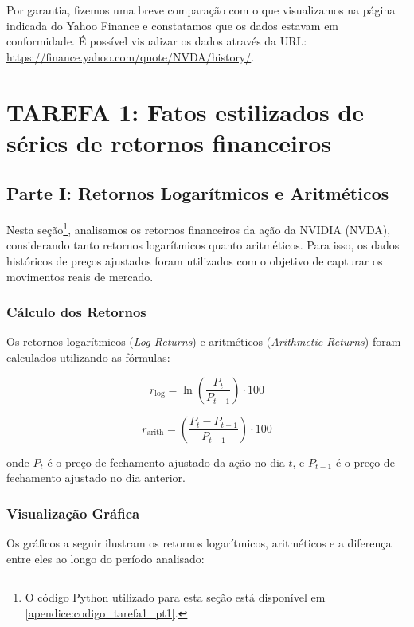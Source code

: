 \documentclass[a4paper, 12pt]{article}
\begin{document}
Por garantia, fizemos uma breve comparação com o que visualizamos na página indicada do Yahoo Finance e constatamos que os dados estavam em conformidade. É possível visualizar os dados através da URL: \url{https://finance.yahoo.com/quote/NVDA/history/}. 

\section{TAREFA 1: Fatos estilizados de séries de retornos financeiros}\label{sec:tarefa1}

\subsection{Parte I: Retornos Logarítmicos e Aritméticos}\label{subsec:tarefa1_pt1}

Nesta seção\footnote{O código Python utilizado para esta seção está disponível em \ref{apendice:codigo_tarefa1_pt1}.}, analisamos os retornos financeiros da ação da NVIDIA (NVDA), considerando tanto retornos logarítmicos quanto aritméticos. Para isso, os dados históricos de preços ajustados foram utilizados com o objetivo de capturar os movimentos reais de mercado.


\subsubsection{Cálculo dos Retornos}
Os retornos logarítmicos (\textit{Log Returns}) e aritméticos (\textit{Arithmetic Returns}) foram calculados utilizando as fórmulas:

\begin{equation}
r_{\text{log}} = \ln \left( \frac{P_t}{P_{t-1}} \right) \cdot 100
\end{equation}

\begin{equation}
r_{\text{arith}} = \left( \frac{P_t - P_{t-1}}{P_{t-1}} \right) \cdot 100
\end{equation}

onde $P_t$ é o preço de fechamento ajustado da ação no dia $t$, e $P_{t-1}$ é o preço de fechamento ajustado no dia anterior.

\subsubsection{Visualização Gráfica}
Os gráficos a seguir ilustram os retornos logarítmicos, aritméticos e a diferença entre eles ao longo do período analisado:
\end{document}
